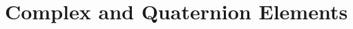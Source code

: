 \documentclass{beamer}
\begin{document}
  


\section{Complex and Quaternion Elements}
\end{document}
